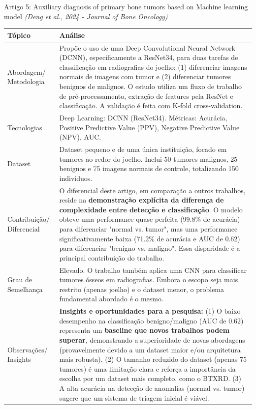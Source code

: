 \documentclass[12pt, a4paper]{article}
\begin{document}
\begin{fichabox}{Artigo 5: Auxiliary diagnosis of primary bone tumors based on Machine learning model}
\textit{(Deng et al., 2024 - Journal of Bone Oncology)}

\begin{longtable}{@{} B L{10.5cm} @{}}
    \toprule
    \textbf{Tópico} & \textbf{Análise} \\
    \midrule
    \endhead
    
    Abordagem/ Metodologia & Propõe o uso de uma Deep Convolutional Neural Network (DCNN), especificamente a ResNet34, para duas tarefas de classificação em radiografias do joelho: (1) diferenciar imagens normais de imagens com tumor e (2) diferenciar tumores benignos de malignos. O estudo utiliza um fluxo de trabalho de pré-processamento, extração de features pela ResNet e classificação. A validação é feita com K-fold cross-validation. \\
    \addlinespace
    
    Tecnologias & Deep Learning: DCNN (ResNet34). Métricas: Acurácia, Positive Predictive Value (PPV), Negative Predictive Value (NPV), AUC. \\
    \addlinespace
    
    Dataset & Dataset pequeno e de uma única instituição, focado em tumores ao redor do joelho. Inclui 50 tumores malignos, 25 benignos e 75 imagens normais de controle, totalizando 150 indivíduos. \\
    \addlinespace
    
    Contribuição/ Diferencial & O diferencial deste artigo, em comparação a outros trabalhos, reside na \textbf{demonstração explícita da diferença de complexidade entre detecção e classificação}. O modelo obteve uma performance quase perfeita (99.8\% de acurácia) para diferenciar "normal vs. tumor", mas uma performance significativamente baixa (71.2\% de acurácia e AUC de 0.62) para diferenciar "benigno vs. maligno". Essa disparidade é a principal contribuição do trabalho. \\
    \addlinespace
    
    Grau de Semelhança & Elevado. O trabalho também aplica uma CNN para classificar tumores ósseos em radiografias. Embora o escopo seja mais restrito (apenas joelho) e o dataset menor, o problema fundamental abordado é o mesmo. \\
    \addlinespace
    
    Observações/ Insights & \textbf{Insights e oportunidades para a pesquisa:} (1) O baixo desempenho na classificação benigno/maligno (AUC de 0.62) representa um \textbf{baseline que novos trabalhos podem superar}, demonstrando a superioridade de novas abordagens (provavelmente devido a um dataset maior e/ou arquitetura mais robusta). (2) O tamanho reduzido do dataset (apenas 75 tumores) é uma limitação clara e reforça a importância da escolha por um dataset mais completo, como o BTXRD. (3) A alta acurácia na detecção de anomalias (normal vs. tumor) sugere que um sistema de triagem inicial é viável. \\
    
    \bottomrule
\end{longtable}
\end{fichabox}
\end{document}
